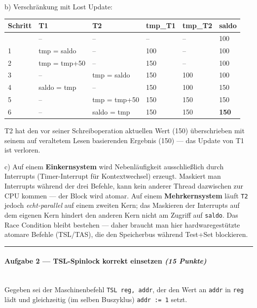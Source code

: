 \documentclass[11pt, a4paper]{article}
\begin{document}
b) Verschränkung mit Lost Update:



{\small
\begin{tabularx}{\linewidth}{XXXXXX}
\hline
\rowcolor{tableheadbg}
{\color{white}\textbf{Schritt}} & {\color{white}\textbf{T1}} & {\color{white}\textbf{T2}} & {\color{white}\textbf{tmp\_T1}} & {\color{white}\textbf{tmp\_T2}} & {\color{white}\textbf{saldo}} \\[2pt]
\hline
\endhead
\hline
\endfoot
0 & – & – & – & – & 100 \\
1 & tmp = saldo & – & 100 & – & 100 \\
2 & tmp = tmp+50 & – & 150 & – & 100 \\
3 & – & tmp = saldo & 150 & 100 & 100 \\
4 & saldo = tmp & – & 150 & 100 & 150 \\
5 & – & tmp = tmp+50 & 150 & 150 & 150 \\
6 & – & saldo = tmp & 150 & 150 & \textbf{150} \\
\end{tabularx}
}


T2 hat den vor seiner Schreiboperation aktuellen Wert (150) überschrieben mit seinem auf veraltetem Lesen basierenden Ergebnis (150) — das Update von T1 ist verloren.


c) Auf einem \textbf{Einkernsystem} wird Nebenläufigkeit ausschließlich durch Interrupts (Timer-Interrupt für Kontextwechsel) erzeugt. Maskiert man Interrupts während der drei Befehle, kann kein anderer Thread dazwischen zur CPU kommen — der Block wird atomar. Auf einem \textbf{Mehrkernsystem} läuft \texttt{T2} jedoch \textit{echt-parallel} auf einem zweiten Kern; das Maskieren der Interrupts auf dem eigenen Kern hindert den anderen Kern nicht am Zugriff auf \texttt{saldo}. Das Race Condition bleibt bestehen — daher braucht man hier hardwaregestützte atomare Befehle (TSL/TAS), die den Speicherbus während Test+Set blockieren.



\noindent\textcolor{rulegray}{\rule{\linewidth}{0.4pt}}


\paragraph{Aufgabe 2 — TSL-Spinlock korrekt einsetzen \textit{(15 Punkte)}}\mbox{}\\[2pt]

Gegeben sei der Maschinenbefehl \texttt{TSL reg, addr}, der den Wert an \texttt{addr} in \texttt{reg} lädt und gleichzeitig (im selben Buszyklus) \texttt{addr := 1} setzt.
\end{document}
